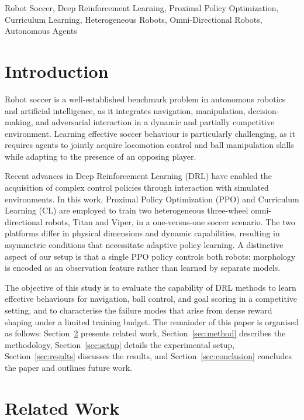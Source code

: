 \documentclass[conference]{IEEEtran}
\begin{document}
\begin{IEEEkeywords}
Robot Soccer, Deep Reinforcement Learning, Proximal Policy Optimization,
Curriculum Learning, Heterogeneous Robots, Omni-Directional Robots,
Autonomous Agents
\end{IEEEkeywords}

\section{Introduction}
Robot soccer is a well-established benchmark problem in autonomous robotics and
artificial intelligence, as it integrates navigation, manipulation,
decision-making, and adversarial interaction in a dynamic and partially
competitive environment. Learning effective soccer behaviour is particularly
challenging, as it requires agents to jointly acquire locomotion control and ball
manipulation skills while adapting to the presence of an opposing player.

Recent advances in Deep Reinforcement Learning (DRL) have enabled the acquisition
of complex control policies through interaction with simulated environments. In
this work, Proximal Policy Optimization (PPO) and Curriculum Learning (CL) are
employed to train two heterogeneous three-wheel omni-directional robots, Titan and
Viper, in a one-versus-one soccer scenario. The two platforms differ in physical
dimensions and dynamic capabilities, resulting in asymmetric conditions that
necessitate adaptive policy learning. A distinctive aspect of our setup is that a
single PPO policy controls both robots: morphology is encoded as an observation
feature rather than learned by separate models.

The objective of this study is to evaluate the capability of DRL methods to learn
effective behaviours for navigation, ball control, and goal scoring in a
competitive setting, and to characterise the failure modes that arise from dense
reward shaping under a limited training budget. The remainder of this paper is
organised as follows: Section~\ref{sec:related} presents related work,
Section~\ref{sec:method} describes the methodology, Section~\ref{sec:setup}
details the experimental setup, Section~\ref{sec:results} discusses the results,
and Section~\ref{sec:conclusion} concludes the paper and outlines future work.

\section{Related Work} \label{sec:related}
\end{document}
